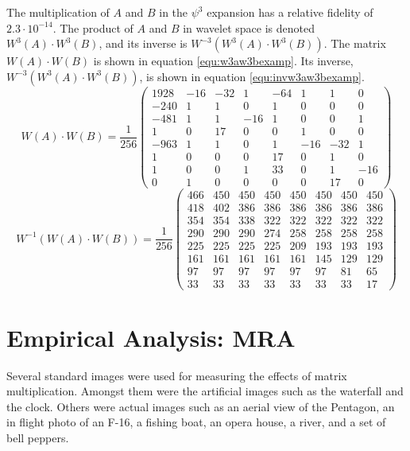 The multiplication of $A$ and $B$ in the $\psi^3$ expansion has a relative fidelity of  $2.3 \cdot 10^{-14}$.   The product of $A$ and $B$ in wavelet space is denoted $W^3(A) \cdot W^3(B)$, and its inverse is $W^{-3}(W^3(A) \cdot W^3(B))$.  
The matrix  $W(A)\cdot  W(B)$ is shown in equation \ref{equ:w3aw3bexamp}.  Its inverse, $W^{-3}(W^3(A) \cdot W^3(B))$, is shown in equation \ref{equ:invw3aw3bexamp}.
\begin{equation}
\label{equ:w3aw3bexamp}
W(A) \cdot W(B) = \frac{1}{256} \left(
\begin{array}{cccccccc}
1928 & -16 & -32 & 1 & -64 & 1 & 1 & 0\\
-240 & 1 & 1 & 0 & 1 & 0 & 0 & 0\\
-481 & 1 & 1 & -16 & 1 & 0 & 0 & 1\\
1 & 0 & 17 & 0 & 0 & 1 & 0 & 0\\
-963 & 1 & 1 & 0 & 1 & -16 & -32 & 1\\
1 & 0 & 0 & 0 & 17 & 0 & 1 & 0\\
1 & 0 & 0 & 1 & 33 & 0 & 1 & -16\\
0 & 1 & 0 & 0 & 0 & 0 & 17 & 0 
\end{array} \right)
\end{equation}
\begin{equation}
\label {equ:invw3aw3bexamp}
 W^{-1}(W(A) \cdot W(B)) = \frac{1}{256} \left(
\begin{array}{cccccccc}
466 & 450 & 450 & 450 & 450 & 450 & 450 & 450\\
418 & 402 & 386 & 386 & 386 & 386 & 386 & 386\\
354 & 354 & 338 & 322 & 322 & 322 & 322 & 322\\
290 & 290 & 290 & 274 & 258 & 258 & 258 & 258\\
225 & 225 & 225 & 225 & 209 & 193 & 193 & 193\\
161 & 161 & 161 & 161 & 161 & 145 & 129 & 129\\
97 & 97 & 97 & 97 & 97 & 97 & 81 & 65\\
33 & 33 & 33 & 33 & 33 & 33 & 33 & 17 
\end{array} \right)
\end{equation}


\section {Empirical Analysis: MRA}

Several standard images were used for measuring the effects of matrix multiplication.  Amongst them were the artificial images such as the waterfall and the clock.  Others were actual images such as an aerial view of the Pentagon, an in flight photo of an F-16, a fishing boat, an opera house, a river, and a set of bell peppers.


